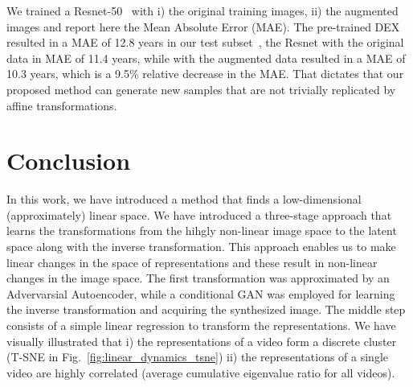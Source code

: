 \documentclass[10pt,twocolumn,letterpaper]{article}
\begin{document}
We trained a Resnet-50~\cite{he2015deep}  with i) the original training images, ii) the augmented images and report here the Mean Absolute Error (MAE). The pre-trained DEX~\cite{rothe2016deep} resulted in a MAE of 12.8 years in our test subset~\cite{moschoglou2017agedb}, the Resnet with the original data in MAE of 11.4 years, while with the augmented data resulted in a MAE of 10.3 years, which is a 9.5\% relative decrease in the MAE. That dictates that our proposed method can generate new samples that are not trivially replicated by affine transformations. 
%
\section{Conclusion}\label{sec:linear_dynamics_conclusion}

In this work, we have introduced a method that finds a low-dimensional (approximately) linear space. We have introduced a three-stage approach that learns the transformations from the hihgly non-linear image space to the latent space along with the inverse transformation. This approach enables us to make linear changes in the space of representations and these result in non-linear changes in the image space. The first transformation was approximated by an Advervarsial Autoencoder, while a conditional GAN was employed for learning the inverse transformation and acquiring the synthesized image. The middle step consists of a simple linear regression to transform the representations. We have visually illustrated that i) the representations of a video form a discrete cluster (T-SNE in Fig.~\ref{fig:linear_dynamics_tsne})  ii) the representations of a single video are highly correlated (average cumulative eigenvalue ratio for all videos). 

%
%
%
%
%


%
%
%
%
%


%
%

{\small


}
\end{document}

